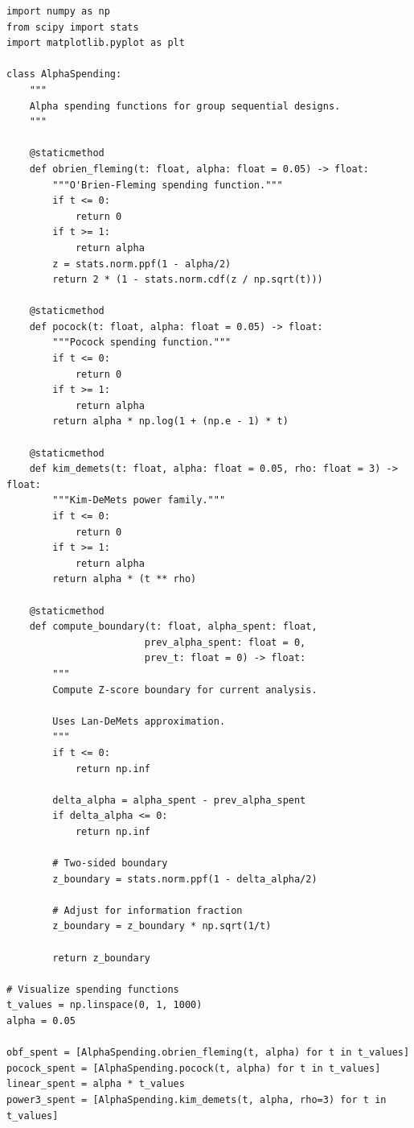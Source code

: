 \lstset{language=Python, caption=Alpha Spending Functions}
\begin{lstlisting}
import numpy as np
from scipy import stats
import matplotlib.pyplot as plt

class AlphaSpending:
    """
    Alpha spending functions for group sequential designs.
    """

    @staticmethod
    def obrien_fleming(t: float, alpha: float = 0.05) -> float:
        """O'Brien-Fleming spending function."""
        if t <= 0:
            return 0
        if t >= 1:
            return alpha
        z = stats.norm.ppf(1 - alpha/2)
        return 2 * (1 - stats.norm.cdf(z / np.sqrt(t)))

    @staticmethod
    def pocock(t: float, alpha: float = 0.05) -> float:
        """Pocock spending function."""
        if t <= 0:
            return 0
        if t >= 1:
            return alpha
        return alpha * np.log(1 + (np.e - 1) * t)

    @staticmethod
    def kim_demets(t: float, alpha: float = 0.05, rho: float = 3) -> float:
        """Kim-DeMets power family."""
        if t <= 0:
            return 0
        if t >= 1:
            return alpha
        return alpha * (t ** rho)

    @staticmethod
    def compute_boundary(t: float, alpha_spent: float,
                        prev_alpha_spent: float = 0,
                        prev_t: float = 0) -> float:
        """
        Compute Z-score boundary for current analysis.

        Uses Lan-DeMets approximation.
        """
        if t <= 0:
            return np.inf

        delta_alpha = alpha_spent - prev_alpha_spent
        if delta_alpha <= 0:
            return np.inf

        # Two-sided boundary
        z_boundary = stats.norm.ppf(1 - delta_alpha/2)

        # Adjust for information fraction
        z_boundary = z_boundary * np.sqrt(1/t)

        return z_boundary

# Visualize spending functions
t_values = np.linspace(0, 1, 1000)
alpha = 0.05

obf_spent = [AlphaSpending.obrien_fleming(t, alpha) for t in t_values]
pocock_spent = [AlphaSpending.pocock(t, alpha) for t in t_values]
linear_spent = alpha * t_values
power3_spent = [AlphaSpending.kim_demets(t, alpha, rho=3) for t in t_values]


\end{lstlisting}
